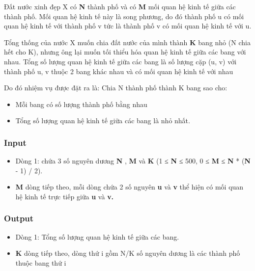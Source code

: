 



Đất nước xinh đẹp X có \textbf{N} thành phố và có \textbf{M} mối quan hệ kinh tế giữa các thành phố. Mối quan hệ kinh tế này là song phương, do đó thành phố u có mối quan hệ kinh tế với thành phố v tức là thành phố v có mối quan hệ kinh tế với u.

Tổng thống của nước X muốn chia đất nước của mình thành \textbf{K} bang nhỏ (N chia hết cho K), nhưng ông lại muốn tối thiểu hóa quan hệ kinh tế giữa các bang với nhau. Tổng số lượng quan hệ kinh tế giữa các bang là số lượng cặp (u, v) với thành phố u, v thuộc 2 bang khác nhau và có mối quan hệ kinh tế với nhau

Do đó nhiệm vụ được đặt ra là: Chia N thành phố thành K bang sao cho:
\begin{itemize}
	\item Mỗi bang có số lượng thành phố bằng nhau
	\item Tổng số lượng quan hệ kinh tế giữa các bang là nhỏ nhất.
\end{itemize}
\begin{itemize}
\end{itemize}

\subsubsection{Input}
\begin{itemize}
	\item Dòng 1: chứa 3 số nguyên dương \textbf{N} , \textbf{M }và \textbf{K} (1 ≤ \textbf{N} ≤ 500, 0 ≤ \textbf{M} ≤ \textbf{N} * (\textbf{N} - 1) / 2).
\end{itemize}
\begin{itemize}
	\item \textbf{M} dòng tiếp theo, mỗi dòng chứa 2 số nguyên \textbf{u} và \textbf{v} thể hiện có mối quan hệ kinh tế trực tiếp giữa \textbf{u} và \textbf{v}\textbf{.}
\end{itemize}

\subsubsection{Output}
\begin{itemize}
	\item Dòng 1: Tổng số lượng quan hệ kinh tế giữa các bang.
	\item \textbf{K }dòng tiếp theo, dòng thứ i gồm N/K số nguyên dương là các thành phố thuộc bang thứ i
\end{itemize}

